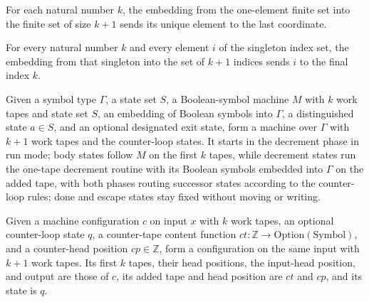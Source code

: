 \begin{definition}
\label{Turing.lastEmb}
\leanok
For each natural number $k$, the embedding from the one-element finite set into the
finite set of size $k+1$ sends its unique element to the last coordinate.
\end{definition}

\begin{theorem}
\label{Turing.lastEmb_apply}
\leanok
{}
For every natural number $k$ and every element $i$ of the singleton index set, the
embedding from that singleton into the set of $k+1$ indices sends $i$ to the final index
$k$.
\end{theorem}

\begin{definition}
\label{Turing.counterLoopTMVia}
\leanok
{}
Given a symbol type $\Gamma$, a state set $S$, a Boolean-symbol machine $M$ with $k$
work tapes and state set $S$, an embedding of Boolean symbols into $\Gamma$, a
distinguished state $a\in S$, and an optional designated exit state, form a machine over
$\Gamma$ with $k+1$ work tapes and the counter-loop states. It starts in the decrement
phase in run mode; body states follow $M$ on the first $k$ tapes, while decrement states
run the one-tape decrement routine with its Boolean symbols embedded into $\Gamma$ on
the added tape, with both phases routing successor states according to the counter-loop
rules; done and escape states stay fixed without moving or writing.
\end{definition}

\begin{definition}
\label{Turing.counterLoopCfg}
\leanok
{}
Given a machine configuration $c$ on input $x$ with $k$ work tapes, an optional
counter-loop state $q$, a counter-tape content function
$ct:\mathbb{Z}\to\mathrm{Option}(\mathrm{Symbol})$, and a counter-head position
$cp\in\mathbb{Z}$, form a configuration on the same input with $k+1$ work tapes. Its
first $k$ tapes, their head positions, the input-head position, and output are those of
$c$, its added tape and head position are $ct$ and $cp$, and its state is $q$.
\end{definition}

